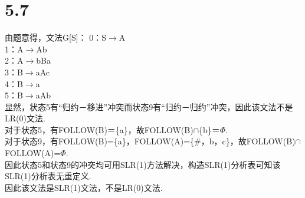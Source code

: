 \documentclass{article}
\begin{document}
\section*{5.7}
\noindent
由题意得，文法G[S]：  
0：S$\rightarrow$A\\  
1：A$\rightarrow$Ab\\  
2：A$\rightarrow$bBa\\  
3：B$\rightarrow$aAc\\  
4：B$\rightarrow$a\\  
5：B$\rightarrow$aAb\\    
显然，状态5有“归约－移进”冲突而状态9有“归约－归约”冲突，因此该文法不是LR(0)文法.  \\
对于状态5，有FOLLOW(B)＝\{a\}，故FOLLOW(B)$\cap$\{b\}＝$\Phi$.\\ 
对于状态9，有FOLLOW(B)=\{a\}，FOLLOW(A)=\{\#，b，c\}，故FOLLOW(B)$\cap$FOLLOW(A)=$\Phi$.\\
因此状态5和状态9的冲突均可用SLR(1)方法解决，构造SLR(1)分析表可知该SLR(1)分析表无重定义.\\
因此该文法是SLR(1)文法，不是LR(0)文法.
\end{document}
